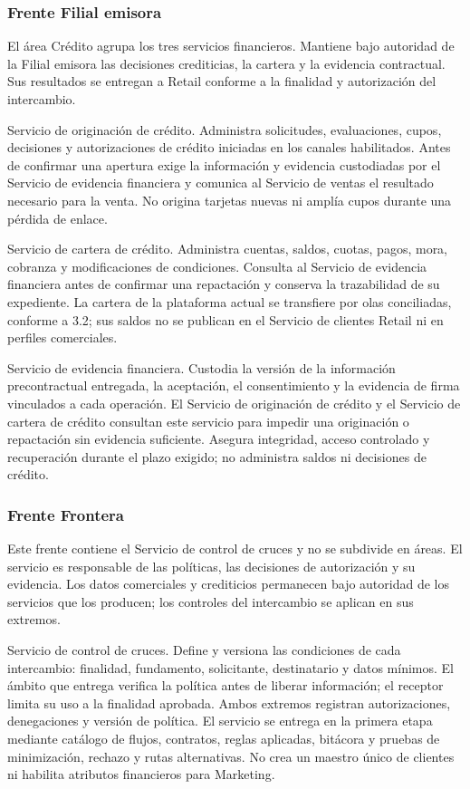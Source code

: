 \documentclass[11pt]{article}
\begin{document}
\subsubsection{Frente Filial emisora}

{El área Crédito agrupa los tres servicios financieros. Mantiene bajo autoridad de la Filial emisora las decisiones crediticias, la cartera y la evidencia contractual. Sus resultados se entregan a Retail conforme a la finalidad y autorización del intercambio.}

{Servicio de originación de crédito. Administra solicitudes, evaluaciones, cupos, decisiones y autorizaciones de crédito iniciadas en los canales habilitados. Antes de confirmar una apertura exige la información y evidencia custodiadas por el Servicio de evidencia financiera y comunica al Servicio de ventas el resultado necesario para la venta. No origina tarjetas nuevas ni amplía cupos durante una pérdida de enlace.}

{Servicio de cartera de crédito. Administra cuentas, saldos, cuotas, pagos, mora, cobranza y modificaciones de condiciones. Consulta al Servicio de evidencia financiera antes de confirmar una repactación y conserva la trazabilidad de su expediente. La cartera de la plataforma actual se transfiere por olas conciliadas, conforme a 3.2; sus saldos no se publican en el Servicio de clientes Retail ni en perfiles comerciales.}

{Servicio de evidencia financiera. Custodia la versión de la información precontractual entregada, la aceptación, el consentimiento y la evidencia de firma vinculados a cada operación. El Servicio de originación de crédito y el Servicio de cartera de crédito consultan este servicio para impedir una originación o repactación sin evidencia suficiente. Asegura integridad, acceso controlado y recuperación durante el plazo exigido; no administra saldos ni decisiones de crédito.}

\subsubsection{Frente Frontera}

{Este frente contiene el Servicio de control de cruces y no se subdivide en áreas. El servicio es responsable de las políticas, las decisiones de autorización y su evidencia. Los datos comerciales y crediticios permanecen bajo autoridad de los servicios que los producen; los controles del intercambio se aplican en sus extremos.}


{Servicio de control de cruces. Define y versiona las condiciones de cada intercambio: finalidad, fundamento, solicitante, destinatario y datos mínimos. El ámbito que entrega verifica la política antes de liberar información; el receptor limita su uso a la finalidad aprobada. Ambos extremos registran autorizaciones, denegaciones y versión de política. El servicio se entrega en la primera etapa mediante catálogo de flujos, contratos, reglas aplicadas, bitácora y pruebas de minimización, rechazo y rutas alternativas. No crea un maestro único de clientes ni habilita atributos financieros para Marketing.}
\end{document}
